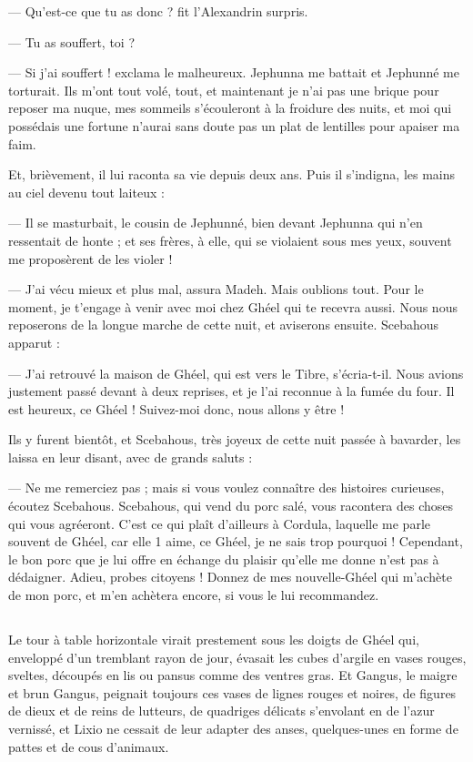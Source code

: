 \documentclass[a4paper, 11pt, oneside, polutonikogreek, french]{article}
\begin{document}
--- Qu'est-ce que tu as donc ? fit l'Alexandrin surpris.

--- Tu as souffert, toi ?

--- Si j'ai souffert ! exclama le malheureux. Jephunna me battait et Jephunné me torturait. Ils m'ont tout volé, tout, et maintenant je n'ai pas une brique pour reposer ma nuque, mes sommeils s'écouleront à la froidure des nuits, et moi qui possédais une fortune n'aurai sans doute pas un plat de lentilles pour apaiser ma faim.

Et, brièvement, il lui raconta sa vie depuis deux ans. Puis il s'indigna, les mains au ciel devenu tout laiteux :

--- Il se masturbait, le cousin de Jephunné, bien devant Jephunna qui n'en ressentait de honte ; et ses frères, à elle, qui se violaient sous mes yeux, souvent me proposèrent de les violer !

--- J'ai vécu mieux et plus mal, assura Madeh. Mais oublions tout. Pour le moment, je t'engage à venir avec moi chez Ghéel qui te recevra aussi. Nous nous reposerons de la longue marche de cette nuit, et aviserons ensuite. Scebahous apparut :

--- J'ai retrouvé la maison de Ghéel, qui est vers le Tibre, s'écria-t-il. Nous avions justement passé devant à deux reprises, et je l'ai reconnue à la fumée du four. Il est heureux, ce Ghéel ! Suivez-moi donc, nous allons y être !

Ils y furent bientôt, et Scebahous, très joyeux de cette nuit passée à bavarder, les laissa en leur disant, avec de grands saluts :

--- Ne me remerciez pas ; mais si vous voulez connaître des histoires curieuses, écoutez Scebahous. Scebahous, qui vend du porc salé, vous racontera des choses qui vous agréeront. C'est ce qui plaît d'ailleurs à Cordula, laquelle me parle souvent de Ghéel, car elle 1 aime, ce Ghéel, je ne sais trop pourquoi ! Cependant, le bon porc que je lui offre en échange du plaisir qu'elle me donne n'est pas à dédaigner. Adieu, probes citoyens ! Donnez de mes nouvelle-Ghéel qui m'achète de mon porc, et m'en achètera encore, si vous le lui recommandez.
\clearpage
\subsection{}
\paragraph{}
Le tour à table horizontale virait prestement sous les doigts de Ghéel qui, enveloppé d'un tremblant rayon de jour, évasait les cubes d'argile en vases rouges, sveltes, découpés en lis ou pansus comme des ventres gras. Et Gangus, le maigre et brun Gangus, peignait toujours ces vases de lignes rouges et noires, de figures de dieux et de reins de lutteurs, de quadriges délicats s'envolant en de l'azur vernissé, et Lixio ne cessait de leur adapter des anses, quelques-unes en forme de pattes et de cous d'animaux.
\end{document}
